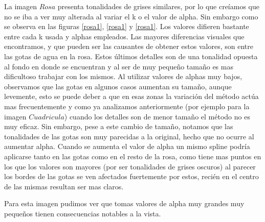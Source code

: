 \documentclass[a4paper]{article}
\begin{document}
La imagen $Rosa$ presenta tonalidades de grises similares, por lo que creíamos que no se iba a ver muy alterada al variar el k o el valor de alpha. Sin embargo como se observa en las figuras \ref{rosa1}, \ref{rosa1} y  \ref{rosa1}. Los valores difieren bastante entre cada k usada y alphas empleados. Las mayores diferencias visuales que encontramos, y que pueden ser las causantes de obtener estos valores, son entre las gotas de agua en la rosa. Estos últimos detalles son de una tonalidad opuesta al fondo en donde se encuentran y al ser de muy pequeño tamaño es mas dificultoso trabajar con los mismos. Al utilizar valores de alphas muy bajos, observamos que las gotas en algunos casos aumentan su tamaño, aunque levemente, esto se puede deber a que en esas zonas la variación del método actúa mas frecuentemente y como ya analizamos anteriormente (por ejemplo para la imagen $Cuadricula$) cuando los detalles son de menor tamaño el método no es muy eficaz. Sin embargo, pese a este cambio de tamaño, notamos que las tonalidades de las gotas son muy parecidas a la original, hecho que no ocurre al aumentar alpha. Cuando se aumenta el valor de alpha un mismo spline podría aplicarse tanto en las gotas como en el resto de la rosa, como tiene mas puntos en los que los valores son mayores (por ser tonalidades de grises oscuros) al parecer los bordes de las gotas se ven afectados fuertemente por estos, recién en el centro de las mismas  resultan ser mas claros. 

Para esta imagen pudimos ver que tomas valores de alpha muy grandes  muy pequeños tienen consecuencias notables a la vista.
\end{document}
